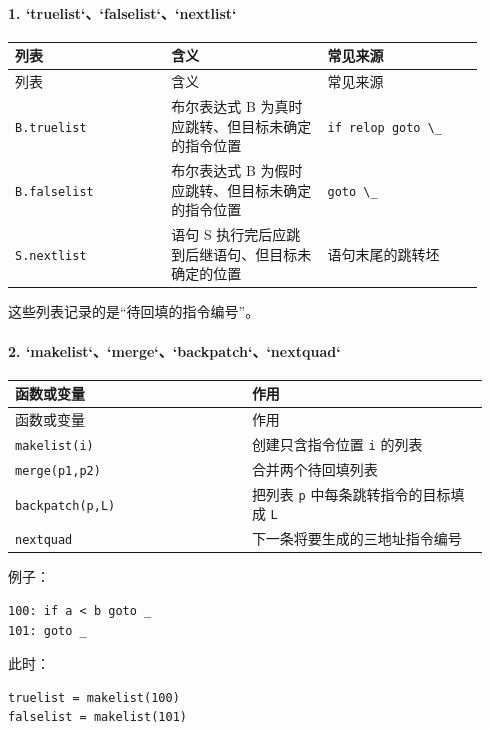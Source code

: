 \documentclass[UTF8]{ctexart}
\begin{document}
\paragraph*{1. `truelist`、`falselist`、`nextlist`}

\begin{longtable}{|p{0.31\linewidth}|p{0.31\linewidth}|p{0.31\linewidth}|}
\hline
列表 & 含义 & 常见来源 \\
\hline
\endfirsthead
列表 & 含义 & 常见来源 \\
\hline
\endhead
\texttt{B.truelist} & 布尔表达式 B 为真时应跳转、但目标未确定的指令位置 & \texttt{if relop goto \textbackslash{}\_} \\
\hline
\texttt{B.falselist} & 布尔表达式 B 为假时应跳转、但目标未确定的指令位置 & \texttt{goto \textbackslash{}\_} \\
\hline
\texttt{S.nextlist} & 语句 S 执行完后应跳到后继语句、但目标未确定的位置 & 语句末尾的跳转坯 \\
\hline
\end{longtable}

这些列表记录的是“待回填的指令编号”。

\paragraph*{2. `makelist`、`merge`、`backpatch`、`nextquad`}

\begin{longtable}{|p{0.47\linewidth}|p{0.47\linewidth}|}
\hline
函数或变量 & 作用 \\
\hline
\endfirsthead
函数或变量 & 作用 \\
\hline
\endhead
\texttt{makelist(i)} & 创建只含指令位置 \texttt{i} 的列表 \\
\hline
\texttt{merge(p1,p2)} & 合并两个待回填列表 \\
\hline
\texttt{backpatch(p,L)} & 把列表 \texttt{p} 中每条跳转指令的目标填成 \texttt{L} \\
\hline
\texttt{nextquad} & 下一条将要生成的三地址指令编号 \\
\hline
\end{longtable}

例子：

\begin{Verbatim}[fontsize=\small,breaklines=true]
100: if a < b goto _
101: goto _
\end{Verbatim}

此时：

\begin{Verbatim}[fontsize=\small,breaklines=true]
truelist = makelist(100)
falselist = makelist(101)
\end{Verbatim}
\end{document}
